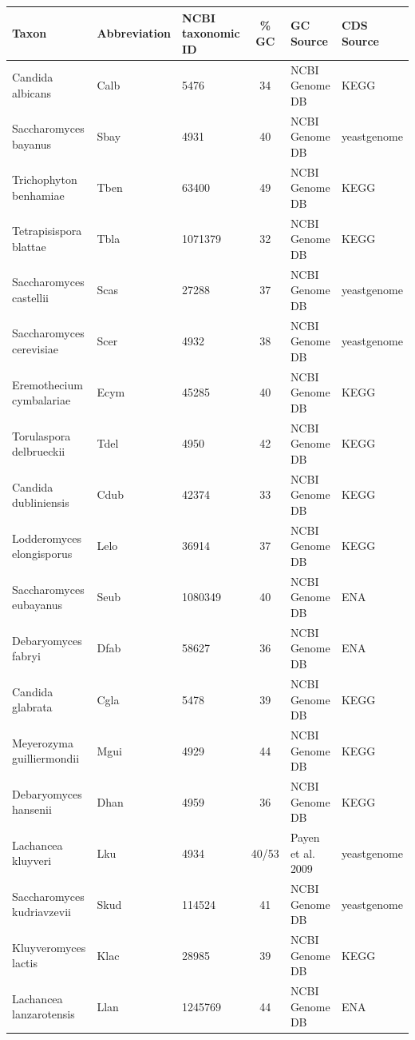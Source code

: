 \documentclass[letter,12pt]{article}
\begin{document}
\begin{table}
\begin{tabular}{ | l | l | l | c | l | l | }
\hline
	Taxon 				& Abbreviation 	& NCBI taxonomic ID 	& \% GC & GC Source  		& CDS Source \\ \hline
	Candida albicans 		& Calb 		& 5476 			& 34 	& NCBI Genome DB 	& KEGG \\ \hline
	Saccharomyces bayanus 		& Sbay 		& 4931 			& 40 	& NCBI Genome DB 	& yeastgenome \\ \hline
	Trichophyton benhamiae 		& Tben		& 63400 		& 49 	& NCBI Genome DB 	& KEGG \\ \hline
	Tetrapisispora blattae 		& Tbla 		& 1071379 		& 32 	& NCBI Genome DB 	& KEGG \\ \hline
	Saccharomyces castellii 	& Scas 		& 27288 		& 37 	& NCBI Genome DB 	& yeastgenome \\ \hline
	Saccharomyces cerevisiae 	& Scer 		& 4932 			& 38 	& NCBI Genome DB 	& yeastgenome \\ \hline
	Eremothecium cymbalariae 	& Ecym 		& 45285 		& 40 	& NCBI Genome DB 	& KEGG \\ \hline
	Torulaspora delbrueckii 	& Tdel 		& 4950 			& 42 	& NCBI Genome DB 	& KEGG \\ \hline
	Candida dubliniensis 		& Cdub 		& 42374 		& 33 	& NCBI Genome DB 	& KEGG \\ \hline
	Lodderomyces elongisporus 	& Lelo 		& 36914 		& 37 	& NCBI Genome DB 	& KEGG \\ \hline
	Saccharomyces eubayanus 	& Seub 		& 1080349 		& 40 	& NCBI Genome DB 	& ENA \\ \hline
	Debaryomyces fabryi 		& Dfab 		& 58627 		& 36 	& NCBI Genome DB 	& ENA \\ \hline
	Candida glabrata 		& Cgla 		& 5478 			& 39 	& NCBI Genome DB 	& KEGG \\ \hline
	Meyerozyma guilliermondii 	& Mgui 		& 4929 			& 44 	& NCBI Genome DB 	& KEGG \\ \hline
	Debaryomyces hansenii 		& Dhan 		& 4959 			& 36 	& NCBI Genome DB 	& KEGG \\ \hline
	Lachancea kluyveri 		& Lku 		& 4934 			& 40/53 & Payen et al. 2009 	& yeastgenome \\ \hline
	Saccharomyces kudriavzevii 	& Skud 		& 114524 		& 41 	& NCBI Genome DB 	& yeastgenome \\ \hline
	Kluyveromyces lactis 		& Klac 		& 28985 		& 39 	& NCBI Genome DB 	& KEGG \\ \hline
	Lachancea lanzarotensis 	& Llan 		& 1245769 		& 44 	& NCBI Genome DB 	& ENA \\ \hline

\end{tabular}
\end{table}
\end{document}
